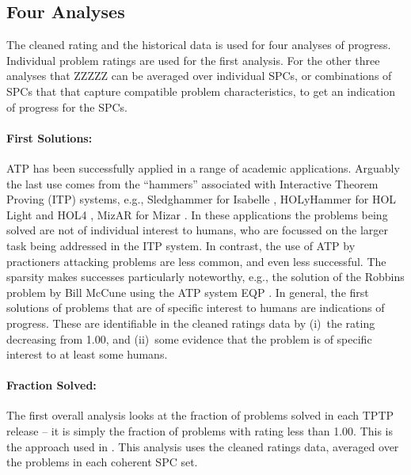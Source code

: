 \documentclass[runningheads]{llncs}
\begin{document}
\subsection{Four Analyses}
\label{AnalysisTypes}

The cleaned rating and the historical data is used for four analyses of progress.
Individual problem ratings are used for the first analysis.
For the other three analyses that ZZZZZ can be averaged over individual SPCs, or combinations of SPCs that
that capture compatible problem characteristics, to get an indication of progress for the SPCs.

\paragraph{First Solutions:}
ATP has been successfully applied in a range of academic applications.
Arguably the last use comes from the ``hammers'' \cite{BK+16} associated with Interactive 
Theorem Proving (ITP) systems, e.g., Sledghammer \cite{PB10} for Isabelle \cite{NPW02}, 
HOLyHammer \cite{KU14} for HOL Light \cite{Har09} and HOL4 \cite{SN08}, 
MizAR \cite{KU15-M40} for Mizar \cite{GKN10}.
In these applications the problems being solved are not of individual interest to humans,
who are focussed on the larger task being addressed in the ITP system.
In contrast, the use of ATP by practioners attacking problems are less common, and even
less successful.
The sparsity makes successes particularly noteworthy, e.g., the solution of the Robbins
problem by Bill McCune using the ATP system EQP \cite{McC97}.
In general, the first solutions of problems that are of specific interest to humans are
indications of progress.
These are identifiable in the cleaned ratings data by (i)~the rating decreasing from 1.00, 
and (ii)~some evidence that the problem is of specific interest to at least some humans.

\paragraph{Fraction Solved:}
The first overall analysis looks at the fraction of problems solved in each TPTP release -- 
it is simply the fraction of problems with rating less than 1.00.
This is the approach used in \cite{SSP21}.
This analysis uses the cleaned ratings data, averaged over the problems in each coherent SPC set.
\end{document}
